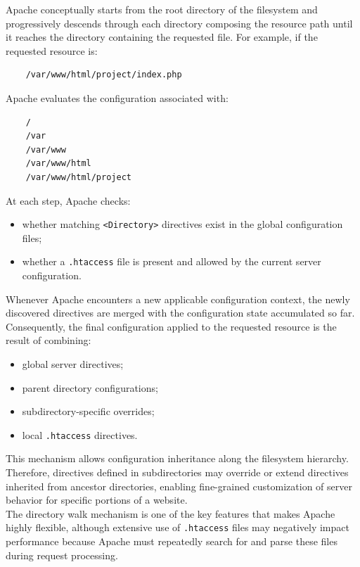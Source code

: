 \documentclass{scrbook}
\begin{document}
	Apache conceptually starts from the root directory of the filesystem and progressively descends through each directory composing the resource path until it reaches the directory containing the requested file. For example, if the requested resource is:
	
	\begin{lstlisting}
	/var/www/html/project/index.php
	\end{lstlisting}
	
	Apache evaluates the configuration associated with:
	\begin{lstlisting}
	/ 
	/var
	/var/www
	/var/www/html
	/var/www/html/project
	\end{lstlisting}
	
	At each step, Apache checks:
	\begin{itemize}
		\item
		whether matching \texttt{<Directory>} directives exist in the global configuration files;
		
		\item
		whether a \texttt{.htaccess} file is present and allowed by the current server configuration.
	\end{itemize}
	
	Whenever Apache encounters a new applicable configuration context, the newly discovered directives are merged with the configuration state accumulated so far. Consequently, the final configuration applied to the requested resource is the result of combining:
	\begin{itemize}
		\item
		global server directives;
		
		\item
		parent directory configurations;
		
		\item
		subdirectory-specific overrides;
		
		\item
		local \texttt{.htaccess} directives.
	\end{itemize}
	
	This mechanism allows configuration inheritance along the filesystem hierarchy. Therefore, directives defined in subdirectories may override or extend directives inherited from ancestor directories, enabling fine-grained customization of server behavior for specific portions of a website.\\
	
	The directory walk mechanism is one of the key features that makes Apache highly flexible, although extensive use of \texttt{.htaccess} files may negatively impact performance because Apache must repeatedly search for and parse these files during request processing.
	
\end{document}
